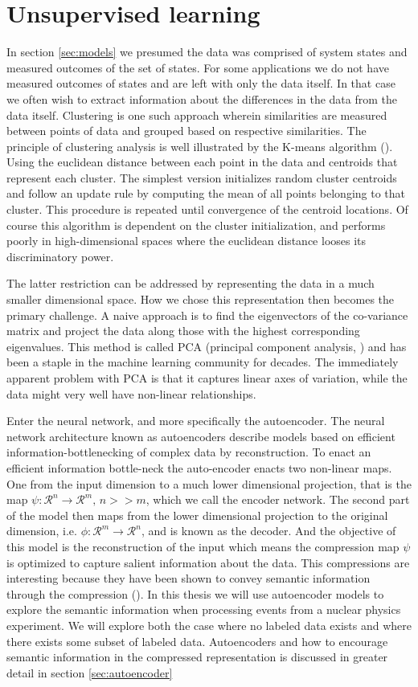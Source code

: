 \section{Unsupervised learning}

In section \ref{sec:models} we presumed the data was comprised of system states and measured outcomes of the set of states. For some applications we do not have measured outcomes of states and are left with only the data itself. In that case we often wish to extract information about the differences in the data from the data itself. Clustering is one such approach wherein similarities are measured between points of data and grouped based on respective similarities. The principle of clustering analysis is well illustrated by the K-means algorithm (\cite{Neyman1967}). Using the euclidean distance between each point in the data and centroids that represent each cluster. The simplest version initializes random cluster centroids and follow an update rule by computing the mean of all points belonging to that cluster. This procedure is repeated until convergence of the centroid locations. Of course this algorithm is dependent on the cluster initialization, and performs poorly in high-dimensional spaces where the euclidean distance looses its discriminatory power. 

The latter restriction can be addressed by representing the data in a much smaller dimensional space. How we chose this representation then becomes the primary challenge. A naive approach is to find the eigenvectors of the co-variance matrix and project the data along those with the highest corresponding eigenvalues. This method is called PCA (principal component analysis, \cite{Marsland2009}) and has been a staple in the machine learning community for decades. The immediately apparent problem with PCA is that it captures linear axes of variation, while the data might very well have non-linear relationships. 

Enter the neural network, and more specifically the autoencoder. The neural network architecture known as autoencoders describe models based on efficient information-bottlenecking of complex data by reconstruction. To enact an efficient information bottle-neck the auto-encoder enacts two non-linear maps. One from the input dimension to a much lower dimensional projection, that is the map $\psi: \mathcal{R}^n \rightarrow \mathcal{R}^m,\, n >> m$, which we call the encoder network. The second part of the model then maps from the lower dimensional projection to the original dimension, i.e. $\phi: \mathcal{R}^m \rightarrow \mathcal{R}^n$, and is known as the decoder. And the objective of this model is the reconstruction of the input which means the compression map $\psi$ is optimized to capture salient information about the data. This compressions are interesting because they have been shown to convey semantic information through the compression (\cite{Fertig}). In this thesis we will use autoencoder models to explore the semantic information when processing events from a nuclear physics experiment. We will explore both the case where no labeled data exists and where there exists some subset of labeled data. Autoencoders and how to encourage semantic information in the compressed representation is discussed in greater detail in section \ref{sec:autoencoder}